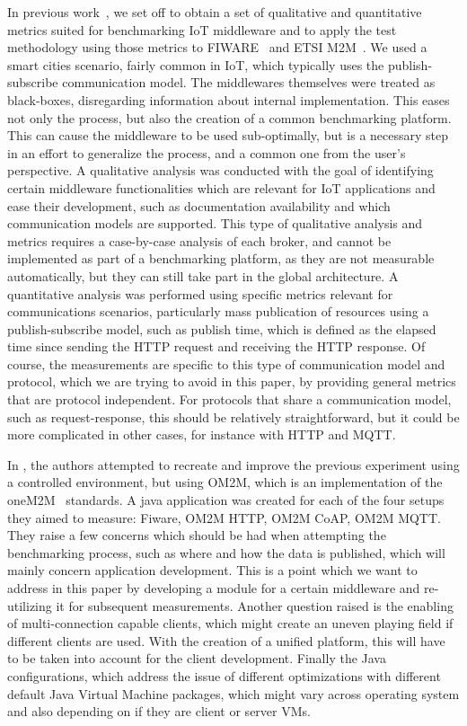 \documentclass[conference]{IEEEtran}
\begin{document}
In previous work~\cite{cardoso_benchmarking_2017}, we set off to obtain a set of qualitative and quantitative metrics suited for benchmarking IoT middleware and to apply the test methodology using those metrics to FIWARE~\cite{FIWARE27:online} and ETSI M2M~\cite{ETSIWelc14:online}. %
We used a smart cities scenario, fairly common in IoT, which typically uses the publish-subscribe communication model. The middlewares themselves were treated as black-boxes, disregarding information about internal implementation. This eases not only the process, but also the creation of a common benchmarking platform. This can cause the middleware to be used sub-optimally, but is a necessary step in an effort to generalize the process, and a common one from the user's perspective. A qualitative analysis was conducted with the goal of identifying certain middleware functionalities which are relevant for IoT applications and ease their development, such as documentation availability and which communication models are supported. This type of qualitative analysis and metrics requires a case-by-case analysis of each broker, and cannot be implemented as part of a benchmarking platform, as they are not measurable automatically, but they can still take part in the global architecture. A quantitative analysis was performed using specific metrics relevant for communications scenarios, particularly mass publication of resources using a publish-subscribe model, such as publish time, which is defined as the elapsed time since sending the HTTP request and receiving the HTTP response. Of course, the measurements are specific to this type of communication model and protocol, which we are trying to avoid in this paper, by providing general metrics that are protocol independent. For protocols that share a communication model, such as request-response, this should be relatively straightforward, but it could be more complicated in other cases, for instance with HTTP and MQTT\@.

In \cite{pereira_benchmarking_2018}, the authors attempted to recreate and improve the previous experiment using a controlled environment, but using OM2M, which is an implementation of the oneM2M~\cite{oneM2MHo30:online} standards. A java application was created for each of the four setups they aimed to measure: Fiware, OM2M HTTP, OM2M CoAP, OM2M MQTT. They raise a few concerns which should be had when attempting the benchmarking process, such as where and how the data is published, which will mainly concern application development. This is a point which we want to address in this paper by developing a module for a certain middleware and re-utilizing it for subsequent measurements. Another question raised is the enabling of multi-connection capable clients, which might create an uneven playing field if different clients are used. With the creation of a unified platform, this will have to be taken into account for the client development. Finally the Java configurations, which address the issue of different optimizations with different default Java Virtual Machine packages, which might vary across operating system and also depending on if they are client or server VMs.
\end{document}
